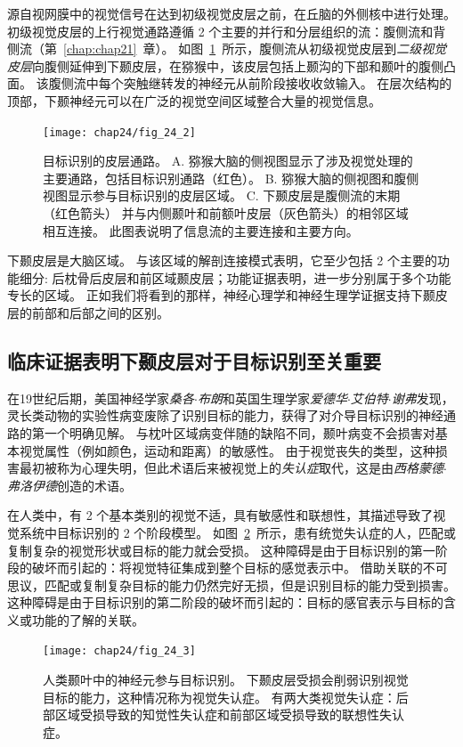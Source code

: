 源自视网膜中的视觉信号在达到初级视觉皮层之前，在丘脑的外侧核中进行处理。
初级视觉皮层的上行视觉通路遵循 2 个主要的并行和分层组织的流：腹侧流和背侧流（第~\ref{chap:chap21}~章）。
如图~\ref{fig:24_2}~所示，腹侧流从初级视觉皮层到\textit{二级视觉皮层}向腹侧延伸到下颞皮层，在猕猴中，该皮层包括上颞沟的下部和颞叶的腹侧凸面。
该腹侧流中每个突触继转发的神经元从前阶段接收收敛输入。
在层次结构的顶部，下颞神经元可以在广泛的视觉空间区域整合大量的视觉信息。


\begin{figure}[htbp]
	\centering
	\texttt{[image: chap24/fig\_24\_2]}
	\caption{目标识别的皮层通路。
		A. 猕猴大脑的侧视图显示了涉及视觉处理的主要通路，包括目标识别通路（红色）。
		B. 猕猴大脑的侧视图和腹侧视图显示参与目标识别的皮层区域。
		C. 下颞皮层是腹侧流的末期（红色箭头） 并与内侧颞叶和前额叶皮层（灰色箭头）的相邻区域相互连接。
		此图表说明了信息流的主要连接和主要方向。}
	\label{fig:24_2}
\end{figure}


下颞皮层是大脑区域。
与该区域的解剖连接模式表明，它至少包括 2 个主要的功能细分: 后枕骨后皮层和前区域颞皮层；功能证据表明，进一步分别属于多个功能专长的区域。
正如我们将看到的那样，神经心理学和神经生理学证据支持下颞皮层的前部和后部之间的区别。



\subsection{临床证据表明下颞皮层对于目标识别至关重要}

在19世纪后期，美国神经学家\textit{桑各$\cdot$布朗}和英国生理学家\textit{爱德华$\cdot$艾伯特$\cdot$谢弗}发现，灵长类动物的实验性病变废除了识别目标的能力，获得了对介导目标识别的神经通路的第一个明确见解。
与枕叶区域病变伴随的缺陷不同，颞叶病变不会损害对基本视觉属性（例如颜色，运动和距离）的敏感性。
由于视觉丧失的类型，这种损害最初被称为心理失明，但此术语后来被视觉上的\textit{失认症}取代，这是由\textit{西格蒙德$\cdot$弗洛伊德}创造的术语。


在人类中，有 2 个基本类别的视觉不适，具有敏感性和联想性，其描述导致了视觉系统中目标识别的 2 个阶段模型。
如图~\ref{fig:24_3}~所示，患有统觉失认症的人，匹配或复制复杂的视觉形状或目标的能力就会受损。
这种障碍是由于目标识别的第一阶段的破坏而引起的：将视觉特征集成到整个目标的感觉表示中。
借助关联的不可思议，匹配或复制复杂目标的能力仍然完好无损，但是识别目标的能力受到损害。
这种障碍是由于目标识别的第二阶段的破坏而引起的：目标的感官表示与目标的含义或功能的了解的关联。


\begin{figure}[htbp]
	\centering
	\texttt{[image: chap24/fig\_24\_3]}
	\caption{人类颞叶中的神经元参与目标识别。
		下颞皮层受损会削弱识别视觉目标的能力，这种情况称为视觉失认症。
		有两大类视觉失认症：后部区域受损导致的知觉性失认症和前部区域受损导致的联想性失认症。}
	\label{fig:24_3}
\end{figure}


